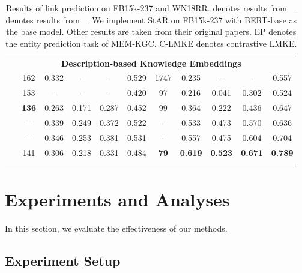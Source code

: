 \documentclass{article}
\begin{document}
\begin{table*}[htbp]
{\begin{tabular}{|c|c|c|c|c|c|c|c|c|c|c|}
        \multicolumn{11}{|c|}{\textbf{Description-based Knowledge Embeddings}} \\ \Xhline{0.8pt}
~\cite{zhang2020pretrainkge} & 162 & 0.332 & - & - & 0.529 & 1747 & 0.235 & - & - & 0.557 \\ \hline
         & 153 & - & - & - & 0.420 & 97 & 0.216 & 0.041 & 0.302 & 0.524 \\ \hline
         & \textbf{136} & 0.263 & 0.171 & 0.287 & 0.452 & 99 & 0.364 & 0.222 & 0.436 & 0.647 \\ \hline
         & - & 0.339 & 0.249 & 0.372 & 0.522 & - & 0.533 & 0.473 & 0.570 & 0.636 \\ \hline
         & - & 0.346 & 0.253 & 0.381 & 0.531 & - & 0.557 & 0.475 & 0.604 & 0.704 \\ \hline
  & 141 & 0.306 & 0.218 & 0.331 & 0.484 & \textbf{79} & \textbf{0.619} & \textbf{0.523} & \textbf{0.671} & \textbf{0.789} \\ 
    \Xhline{0.8pt}
    \end{tabular}}
    \caption{Results of link prediction on FB15k-237 and WN18RR.
     denotes results from ~\protect\cite{sun2019rotate}.
     denotes results from ~\protect\cite{wang2021star}.
    We implement StAR on FB15k-237 with BERT-base as the base model.
    Other results are taken from their original papers.
    EP denotes the entity prediction task of MEM-KGC. 
    C-LMKE denotes contrastive LMKE.}
    \label{tab:main_exp}
\end{table*}



\section{Experiments and Analyses}


In this section, we evaluate the effectiveness of our methods. 

\subsection{Experiment Setup}
\end{document}
